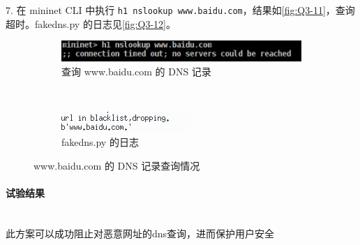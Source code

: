 \documentclass[format=draft,language=chinese,category=SDN]{hustreport}
\newcommand{\myparagraph}[1]{\paragraph{#1}\mbox{}\\}
\newcommand{\code}{\texttt}
\begin{document}
7. 在 mininet CLI 中执行 \code{h1 nslookup www.baidu.com}，结果如\autoref{fig:Q3-11}，查询超时。fakedns.py 的日志见\autoref{fig:Q3-12}。
\begin{figure}[!h]
\centering
  \begin{subfigure}[b]{0.48\textwidth}
  \includegraphics[width=\textwidth]{fig/3_11}
  \caption{查询 www.baidu.com 的 DNS 记录}\label{fig:Q3-11}
  \end{subfigure}
  ~
  \begin{subfigure}[b]{0.48\textwidth}
  \includegraphics[width=\textwidth]{fig/3_12}
  \caption{fakedns.py 的日志}\label{fig:Q3-12}
  \end{subfigure}
\caption{www.baidu.com 的 DNS 记录查询情况}\label{fig:Q3-S3}
\end{figure}

\myparagraph{试验结果}
此方案可以成功阻止对恶意网址的dns查询，进而保护用户安全
\clearpage

\backmatter






\end{document}
